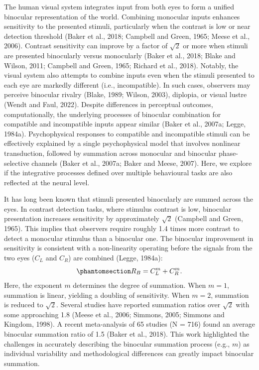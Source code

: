 \documentclass[
  12pt,
]{article}
\begin{document}
The human visual system integrates input from both eyes to form a
unified binocular representation of the world. Combining monocular
inputs enhances sensitivity to the presented stimuli, particularly when
the contrast is low or near detection threshold (Baker et al., 2018;
Campbell and Green, 1965; Meese et al., 2006). Contrast sensitivity can
improve by a factor of \(\sqrt{2}\) or more when stimuli are presented
binocularly versus monocularly (Baker et al., 2018; Blake and Wilson,
2011; Campbell and Green, 1965; Richard et al., 2018). Notably, the
visual system also attempts to combine inputs even when the stimuli
presented to each eye are markedly different (i.e., incompatible). In
such cases, observers may perceive binocular rivalry (Blake, 1989;
Wilson, 2003), diplopia, or visual lustre (Wendt and Faul, 2022).
Despite differences in perceptual outcomes, computationally, the
underlying processes of binocular combination for compatible and
incompatible inputs appear similar (Baker et al., 2007a; Legge, 1984a).
Psychophysical responses to compatible and incompatible stimuli can be
effectively explained by a single psychophysical model that involves
nonlinear transduction, followed by summation across monocular and
binocular phase-selective channels (Baker et al., 2007a; Baker and
Meese, 2007). Here, we explore if the integrative processes defined over
multiple behavioural tasks are also reflected at the neural level.

It has long been known that stimuli presented binocularly are summed
across the eyes. In contrast detection tasks, where stimulus contrast is
low, binocular presentation increases sensitivity by approximately
\(\sqrt{2}\) (Campbell and Green, 1965). This implies that observers
require roughly 1.4 times more contrast to detect a monocular stimulus
than a binocular one. The binocular improvement in sensitivity is
consistent with a non-linearity operating before the signals from the
two eyes (\(C_L\) and \(C_R\)) are combined (Legge, 1984a):
\begin{equation}\phantomsection\label{eq-IntroMath1}{
R_B = C_L^m + C_R^m.
}\end{equation} Here, the exponent \(m\) determines the degree of
summation. When \(m = 1\), summation is linear, yielding a doubling of
sensitivity. When \(m = 2\), summation is reduced to \(\sqrt{2}\).
Several studies have reported summation ratios over \(\sqrt{2}\) with
some approaching 1.8 (Meese et al., 2006; Simmons, 2005; Simmons and
Kingdom, 1998). A recent meta-analysis of 65 studies (N = 716) found an
average binocular summation ratio of 1.5 (Baker et al., 2018). This work
highlighted the challenges in accurately describing the binocular
summation process (e.g., \(m\)) as individual variability and
methodological differences can greatly impact binocular summation.
\end{document}
